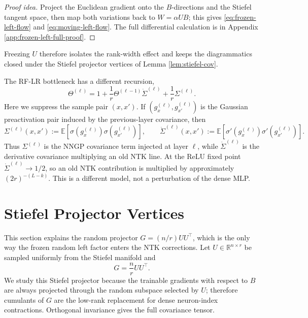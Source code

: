 \documentclass{article}
\newcommand{\E}{\mathbb E}
\newcommand{\R}{\mathbb R}
\begin{document}
\begin{proof}[Proof idea]
Project the Euclidean gradient onto the \(B\)-directions and the Stiefel tangent space, then map both variations back to \(W=\alpha UB\); this gives \eqref{eq:frozen-left-flow} and \eqref{eq:moving-left-flow}. The full differential calculation is in Appendix \ref{app:frozen-left-full-proof}.
\end{proof}

Freezing \(U\) therefore isolates the rank-width effect and keeps the diagrammatics closed under the Stiefel projector vertices of Lemma \ref{lem:stiefel-cov}.

The RF-LR bottleneck has a different recursion,
\begin{equation}
\Theta^{(\ell)}=1+\frac1r\Theta^{(\ell-1)}\dot\Sigma^{(\ell)}+\frac1r\Sigma^{(\ell)}.
\label{eq:rflr-recursion}
\end{equation}
Here we suppress the sample pair \((x,x')\). If \((g_x^{(\ell)},g_{x'}^{(\ell)})\) is the Gaussian preactivation pair induced by the previous-layer covariance, then
\begin{equation}
\Sigma^{(\ell)}(x,x')
:=\E\!\left[\sigma(g_x^{(\ell)})\sigma(g_{x'}^{(\ell)})\right],
\qquad
\dot\Sigma^{(\ell)}(x,x')
:=\E\!\left[\sigma'(g_x^{(\ell)})\sigma'(g_{x'}^{(\ell)})\right].
\label{eq:rflr-sigma-definitions}
\end{equation}
Thus \(\Sigma^{(\ell)}\) is the NNGP covariance term injected at layer \(\ell\), while \(\dot\Sigma^{(\ell)}\) is the derivative covariance multiplying an old NTK line. At the ReLU fixed point \(\dot\Sigma^{(\ell)}\to1/2\), so an old NTK contribution is multiplied by approximately \((2r)^{-(L-k)}\). This is a different model, not a perturbation of the dense MLP.

\section{Stiefel Projector Vertices}
\label{sec:stiefel-projector-vertices}
This section explains the random projector \(G=(n/r)UU^\top\), which is the only way the frozen random left factor enters the NTK corrections.
Let \(U\in\R^{n\times r}\) be sampled uniformly from the Stiefel manifold and
\begin{equation}
G=\frac nr UU^\top.
\label{eq:projector-G}
\end{equation}
We study this Stiefel projector because the trainable gradients with respect to \(B\) are always projected through the random subspace selected by \(U\); therefore cumulants of \(G\) are the low-rank replacement for dense neuron-index contractions. Orthogonal invariance gives the full covariance tensor.
\end{document}
